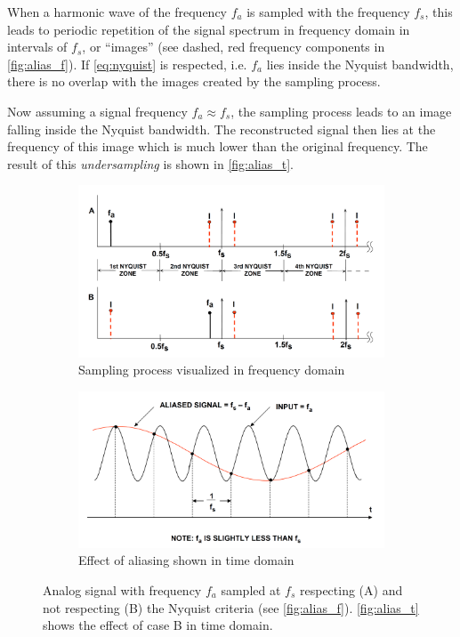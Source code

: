 When a harmonic wave of the frequency $f_a$ is sampled with the frequency $f_s$, this leads to periodic repetition of the signal spectrum in frequency domain in intervals of $f_s$, or ``images'' (see dashed, red frequency components in \autoref{fig:alias_f}). 
If \autoref{eq:nyquist} is respected, i.e. $f_a$ lies inside the Nyquist bandwidth, there is no overlap with the images created by the sampling process.

Now assuming a signal frequency $f_a \approx f_s$, the sampling process leads to an image falling inside the Nyquist bandwidth.
The reconstructed signal then lies at the frequency of this image which is much lower than the original frequency.
The result of this \textit{undersampling} is shown in \autoref{fig:alias_t}.




\begin{figure}[tbh]
	\centering
	\begin{subfigure}{\textwidth}
		\centering
		\includegraphics[width=\linewidth]{chap/02-theory/img/alias_f}  
		\caption{Sampling process visualized in frequency domain}
		\label{fig:alias_f}
	\end{subfigure}
	\begin{subfigure}{\textwidth}
		\centering
		\includegraphics[width=\linewidth]{chap/02-theory/img/alias_t}  
		\caption{Effect of aliasing shown in time domain}
		\label{fig:alias_t}
	\end{subfigure}
	\caption[Aliasing]{Analog signal with frequency $f_a$ sampled at $f_s$ respecting (A) and not respecting (B) the Nyquist criteria (see \autoref{fig:alias_f}). \autoref{fig:alias_t} shows the effect of case B in time domain. \cite{walt}}
	\label{fig:aliasing}
\end{figure}





